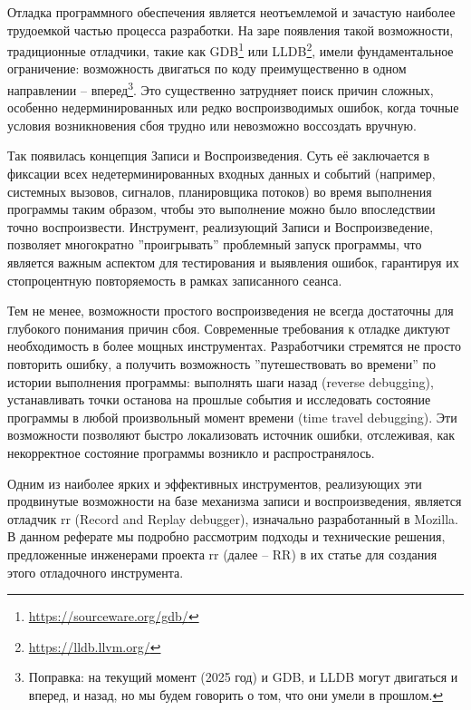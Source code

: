 


Отладка программного обеспечения является неотъемлемой и зачастую наиболее
трудоемкой частью процесса разработки. На заре появления такой возможности,
традиционные отладчики, такие как
GDB\footnote{\url{https://sourceware.org/gdb/}} или
LLDB\footnote{\url{https://lldb.llvm.org/}}, имели фундаментальное ограничение:
возможность двигаться по коду преимущественно в одном направлении –
вперед\footnote{Поправка: на текущий момент (2025 год) и GDB, и LLDB могут
двигаться и вперед, и назад, но мы будем говорить о том, что они умели в
прошлом.}. Это существенно затрудняет поиск причин сложных, особенно
недерминированных или редко воспроизводимых ошибок, когда точные условия
возникновения сбоя трудно или невозможно воссоздать вручную.

Так появилась концепция Записи и Воспроизведения. Суть её заключается в
фиксации всех недетерминированных входных данных и событий (например, системных
вызовов, сигналов, планировщика потоков) во время выполнения программы таким
образом, чтобы это выполнение можно было впоследствии точно воспроизвести.
Инструмент, реализующий Записи и Воспроизведение, позволяет многократно
''проигрывать'' проблемный запуск программы, что является важным аспектом для
тестирования и выявления ошибок, гарантируя их стопроцентную повторяемость в
рамках записанного сеанса.

Тем не менее, возможности простого воспроизведения не всегда достаточны для
глубокого понимания причин сбоя. Современные требования к отладке диктуют
необходимость в более мощных инструментах. Разработчики стремятся не просто
повторить ошибку, а получить возможность ''путешествовать во времени'' по истории
выполнения программы: выполнять шаги назад (reverse debugging), устанавливать
точки останова на прошлые события и исследовать состояние программы в любой
произвольный момент времени (time travel debugging). Эти возможности позволяют
быстро локализовать источник ошибки, отслеживая, как некорректное состояние
программы возникло и распространялось.

Одним из наиболее ярких и эффективных инструментов, реализующих эти продвинутые
возможности на базе механизма записи и воспроизведения, является отладчик rr
(Record and Replay debugger), изначально разработанный в Mozilla. В данном
реферате мы подробно рассмотрим подходы и технические решения, предложенные
инженерами проекта rr (далее – RR) в их статье \cite{rr-paper}
для создания этого отладочного инструмента.